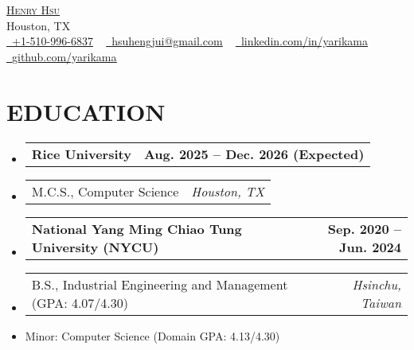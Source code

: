 \documentclass[letterpaper,11pt]{article}
\makeatletter
\newcommand{\mylocation}{Houston, TX}
\newcommand{\resumeItem}[1]{
  \item\small{#1}
}
\newcommand{\resumeSubheadingnull}[2]{
  \item
    \begin{tabular*}{1.0\textwidth}[t]{l@{\extracolsep{\fill}}r}
      \textbf{#1} & \textbf{\small #2} \\
    \end{tabular*}\vspace{3pt}
}
\newcommand{\resumeSubItema}[2]{
  \item
    \begin{tabular*}{1.0\textwidth}[t]{l@{\extracolsep{\fill}}r}
      \small#1 & \textit{\small #2} \\
    \end{tabular*}
}
\newcommand{\resumeSubItem}[1]{\resumeItem{#1}}
\newcommand{\resumeSubHeadingListStart}{\begin{itemize}[leftmargin=0.0in, label={}]}
\newcommand{\resumeSubHeadingListEnd}{\end{itemize}}
\makeatother
\begin{document}

\begin{center}
	{\Huge \scshape \href{https://yarikama.world}{Henry Hsu}} \\
    {\small\color{gray} \mylocation} \\
	\href{tel:+1-510-996-6837}{\raisebox{-0.2\height}\faPhone\  \underline{+1-510-996-6837}} ~
	\href{mailto:hsuhengjui@gmail.com}{\raisebox{-0.2\height}\faEnvelope\  \underline{hsuhengjui@gmail.com}} ~
	\href{https://linkedin.com/in/yarikama/}{\raisebox{-0.2\height}\faLinkedin\ \underline{linkedin.com/in/yarikama}}  ~
	\href{https://github.com/yarikama}{\raisebox{-0.2\height}\faGithub\ \underline{github.com/yarikama}}
	\vspace{-4pt}
\end{center}
\section{EDUCATION}
\resumeSubHeadingListStart
\resumeSubheadingnull
{Rice University}{Aug. 2025 -- Dec. 2026 (Expected)}{}{}
\vspace{-20pt}
\resumeSubItema{M.C.S., Computer Science}{Houston, TX}
\vspace{-15pt}
\resumeSubHeadingListEnd


\resumeSubHeadingListStart
\resumeSubheadingnull
{National Yang Ming Chiao Tung University (NYCU)}{Sep. 2020 -- Jun. 2024}
\vspace{-20pt}
\resumeSubItema{B.S., Industrial Engineering and Management (GPA: 4.07/4.30)}{Hsinchu, Taiwan}
\resumeSubItem{Minor: Computer Science (Domain GPA: 4.13/4.30)}
\resumeSubHeadingListEnd

\end{document}
